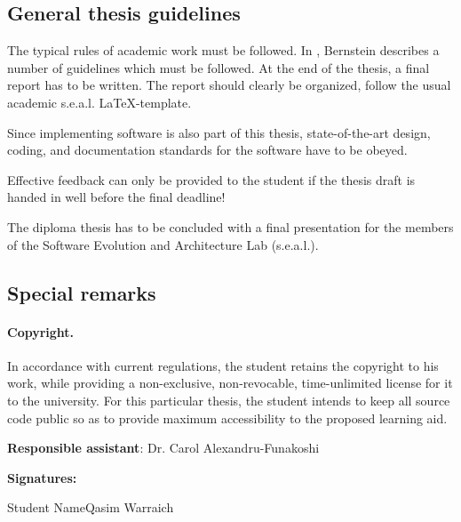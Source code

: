 \documentclass{task_description}
\begin{document}
\subsection*{General thesis guidelines}

The typical rules of academic work must be followed. In
\cite{Bernstein2005-daguide}, Bernstein describes a number of guidelines which
must be followed. At the end of the thesis, a final report has to be
written. The report should clearly be organized, follow the usual academic
s.e.a.l. \LaTeX-template.

Since implementing software is also part of this thesis, state-of-the-art
design, coding, and documentation standards for the software have to be obeyed.

Effective feedback can only be provided to the student if the thesis draft is handed in well before the final deadline!

The diploma thesis has to be concluded with a final presentation for the members
of the Software Evolution and Architecture Lab (s.e.a.l.).

\subsection*{Special remarks}
\paragraph{Copyright.}
In accordance with current regulations, the student retains the copyright to his work, while providing a non-exclusive, non-revocable, time-unlimited license for it to the university. For this particular thesis, the student intends to keep all source code public so as to provide maximum accessibility to the proposed learning aid. 

\vspace{2em}
\noindent\textbf{Responsible assistant}: Dr. Carol Alexandru-Funakoshi

\vspace{2em}
\noindent\textbf{Signatures:}

\vspace{3\baselineskip}
\noindent Student Name\hfill Qasim Warraich
\vspace{2cm}


\end{document}
